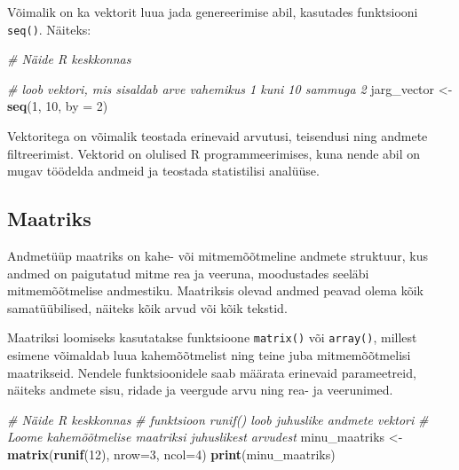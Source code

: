 \documentclass[
]{book}
\newenvironment{Shaded}{\begin{snugshade}}{\end{snugshade}}
\newcommand{\AttributeTok}[1]{\textcolor[rgb]{0.13,0.29,0.53}{#1}}
\newcommand{\CommentTok}[1]{\textcolor[rgb]{0.56,0.35,0.01}{\textit{#1}}}
\newcommand{\DecValTok}[1]{\textcolor[rgb]{0.00,0.00,0.81}{#1}}
\newcommand{\FunctionTok}[1]{\textcolor[rgb]{0.13,0.29,0.53}{\textbf{#1}}}
\newcommand{\NormalTok}[1]{#1}
\newcommand{\OtherTok}[1]{\textcolor[rgb]{0.56,0.35,0.01}{#1}}
\renewenvironment{Shaded} {\begin{snugshade}\footnotesize} {\end{snugshade}}
\theoremstyle{definition}
\theoremstyle{definition}
\theoremstyle{definition}
\theoremstyle{definition}
\theoremstyle{remark}
\begin{document}
Võimalik on ka vektorit luua jada genereerimise abil, kasutades funktsiooni \texttt{seq()}. Näiteks:

\begin{Shaded}
\begin{Highlighting}[]
\CommentTok{\# Näide R keskkonnas}

\CommentTok{\# loob vektori, mis sisaldab arve vahemikus 1 kuni 10 sammuga 2}
\NormalTok{jarg\_vector }\OtherTok{\textless{}{-}} \FunctionTok{seq}\NormalTok{(}\DecValTok{1}\NormalTok{, }\DecValTok{10}\NormalTok{, }\AttributeTok{by =} \DecValTok{2}\NormalTok{) }
\end{Highlighting}
\end{Shaded}

Vektoritega on võimalik teostada erinevaid arvutusi, teisendusi ning andmete filtreerimist. Vektorid on olulised R programmeerimises, kuna nende abil on mugav töödelda andmeid ja teostada statistilisi analüüse.

\subsection{Maatriks}\label{maatriks}

Andmetüüp maatriks on kahe- või mitmemõõtmeline andmete struktuur, kus andmed on paigutatud mitme rea ja veeruna, moodustades seeläbi mitmemõõtmelise andmestiku. Maatriksis olevad andmed peavad olema kõik samatüübilised, näiteks kõik arvud või kõik tekstid.

Maatriksi loomiseks kasutatakse funktsioone \texttt{matrix()} või \texttt{array()}, millest esimene võimaldab luua kahemõõtmelist ning teine juba mitmemõõtmelisi maatrikseid. Nendele funktsioonidele saab määrata erinevaid parameetreid, näiteks andmete sisu, ridade ja veergude arvu ning rea- ja veerunimed.

\begin{Shaded}
\begin{Highlighting}[]
\CommentTok{\# Näide R keskkonnas}
\CommentTok{\# funktsioon runif() loob juhuslike andmete vektori}
\CommentTok{\# Loome kahemõõtmelise maatriksi juhuslikest arvudest}
\NormalTok{minu\_maatriks }\OtherTok{\textless{}{-}} \FunctionTok{matrix}\NormalTok{(}\FunctionTok{runif}\NormalTok{(}\DecValTok{12}\NormalTok{), }\AttributeTok{nrow=}\DecValTok{3}\NormalTok{, }\AttributeTok{ncol=}\DecValTok{4}\NormalTok{)}
\FunctionTok{print}\NormalTok{(minu\_maatriks)}
\end{Highlighting}
\end{Shaded}
\end{document}
